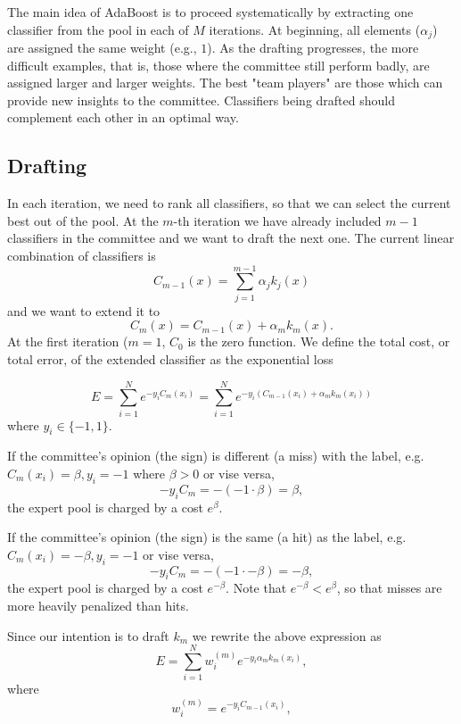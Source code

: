 \documentclass[]{article}  %
\begin{document}
The main idea of AdaBoost is to proceed systematically by extracting one classifier from the pool in each of $M$ iterations. At beginning, all elements ($\alpha_j$) are assigned the same weight (e.g., $1$). As the drafting progresses, the more difficult examples, that is, those where the committee still perform badly, are assigned larger and larger weights. The best "team players" are those which can provide new insights to the committee. Classifiers being drafted should complement each other in an optimal way.

\subsection{Drafting}

In each iteration, we need to rank all classifiers, so that we can select the current best out of the pool. At the $m$-th iteration we have already included $m-1$ classifiers in the committee and we want to draft the next one. The current linear combination of classifiers is 
\[
C_{m-1}(x) = \sum_{j=1}^{m-1} \alpha_j k_j(x)
\]
and we want to extend it to
\[
C_m(x) = C_{m-1}(x) + \alpha_m k_m(x).
\]
At the first iteration ($m=1$, $C_0$ is the zero function. We define the total cost, or total error, of the extended classifier as the exponential loss

\[
E = \sum_{i=1}^N e^{-y_i C_{m}(x_i)} = \sum_{i=1}^N e^{-y_i (C_{m-1}(x_i) + \alpha_m k_m(x_i))}
\]
where $y_i \in \{-1,1\}$. 

If the committee's opinion (the sign) is different (a miss) with the label, e.g. $C_m(x_i) = \beta, y_i = -1$ where $\beta > 0$ or vise versa, 
\[
- y_i C_m = - (-1 \cdot \beta) = \beta,
\]
the expert pool is charged by a cost $e^\beta$.

If the committee's opinion (the sign) is the same (a hit) as the label, e.g. $C_m(x_i) = -\beta, y_i = -1$ or vise versa, 
\[
- y_i C_m = - (-1 \cdot -\beta) = -\beta,
\]
the expert pool is charged by a cost $e^{-\beta}$. Note that $e^{-\beta} < e^{\beta}$, so that misses are more heavily penalized than hits. 

Since our intention is to draft $k_m$ we rewrite the above expression as
\begin{equation}\label{w1}
E = \sum_{i=1}^N w_i^{(m)} e^{-y_i \alpha_m k_m(x_i)},
\end{equation}
where 
\begin{equation}
w_i^{(m)} = e^{-y_i C_{m-1} (x_i)},
\end{equation}
\end{document}

